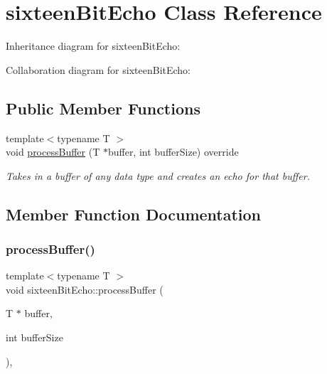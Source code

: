 \hypertarget{classsixteenBitEcho}{}\section{sixteen\+Bit\+Echo Class Reference}
\label{classsixteenBitEcho}


Inheritance diagram for sixteen\+Bit\+Echo\+:


Collaboration diagram for sixteen\+Bit\+Echo\+:
\subsection*{Public Member Functions}
\begin{DoxyCompactItemize}
\item 
{\footnotesize template$<$typename T $>$ }\\void \hyperlink{classsixteenBitEcho_a4576b25b5350661bdbb5b4048d55d6d2}{process\+Buffer} (T $\ast$buffer, int buffer\+Size) override
\begin{DoxyCompactList}\small\item\em Takes in a buffer of any data type and creates an echo for that buffer. \end{DoxyCompactList}\end{DoxyCompactItemize}


\subsection{Member Function Documentation}
\mbox{\label{classsixteenBitEcho_a4576b25b5350661bdbb5b4048d55d6d2}} 
\subsubsection{\texorpdfstring{process\+Buffer()}{processBuffer()}}
{\footnotesize\ttfamily template$<$typename T $>$ \\
void sixteen\+Bit\+Echo\+::process\+Buffer (\begin{DoxyParamCaption}\item[{T $\ast$}]{buffer,  }\item[{int}]{buffer\+Size }\end{DoxyParamCaption})\hspace{0.3cm}{\ttfamily [inline]}, {\ttfamily [override]}}



